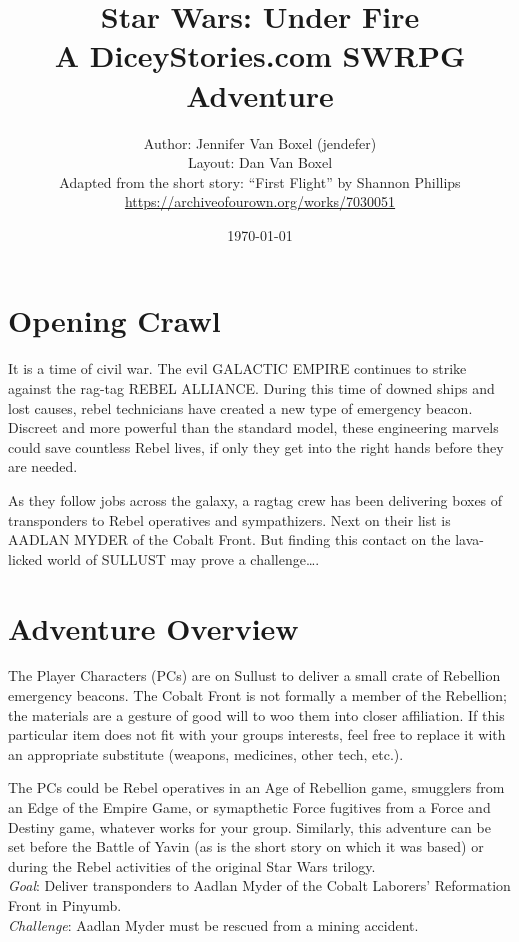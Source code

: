 \documentclass{book}
\title{
Star Wars: Under Fire \\
A DiceyStories.com SWRPG Adventure\\
}
\author{Author: Jennifer Van Boxel (jendefer)\\
        Layout: Dan Van Boxel\\
        Adapted from the short story: ``First Flight'' by Shannon Phillips \\\url{https://archiveofourown.org/works/7030051}}
\date{\today}
\begin{document}
\maketitle


\begin{multicols*}{2}
\section{Opening Crawl}


It is a time of civil war. The evil GALACTIC EMPIRE continues to strike against the rag-tag REBEL ALLIANCE. During this time of downed ships and lost causes, rebel technicians have created a new type of emergency beacon. Discreet and more powerful than the standard model, these engineering marvels could save countless Rebel lives, if only they get into the right hands before they are needed.

As they follow jobs across the galaxy, a ragtag crew has been delivering boxes of transponders to Rebel operatives and sympathizers. Next on their list is AADLAN MYDER of the Cobalt Front. But finding this contact on the lava-licked world of SULLUST may prove a challenge….



\section{Adventure Overview }

    The Player Characters (PCs) are on Sullust to deliver a small crate of Rebellion emergency beacons. The Cobalt Front is not formally a member of the Rebellion; the materials are a gesture of good will to woo them into closer affiliation. If this particular item does not fit with your groups interests, feel free to replace it with an appropriate substitute (weapons, medicines, other tech, etc.).

The PCs could be Rebel operatives in an Age of Rebellion game, smugglers from an Edge of the Empire Game, or symapthetic Force fugitives from a Force and Destiny game, whatever works for your group. Similarly, this adventure can be set before the Battle of Yavin (as is the short story on which it was based) or during the Rebel activities of the original Star Wars trilogy.\\
\emph{Goal}: Deliver transponders to Aadlan Myder of the Cobalt Laborers’ Reformation Front in Pinyumb.\\
\emph{Challenge}: Aadlan Myder must be rescued from a mining accident.


\end{multicols*}
\end{document}
